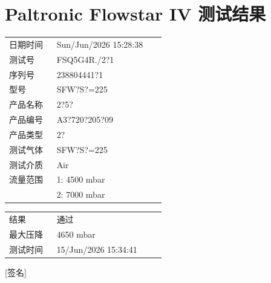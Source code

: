 \documentclass[UTF8,10pt,a4paper,fontset=fandol]{ctexart}
\newcommand{\fieldvalue}[1]{#1}
\newcommand{\handwritten}[1]{#1}
\begin{document}
\newpage

\section*{Paltronic Flowstar IV 测试结果}

\begin{tabular}{@{}p{0.27\linewidth}p{0.62\linewidth}@{}}
日期时间 &
\fieldvalue{Sun/Jun/2026 15:28:38}
\\
测试号 &
\fieldvalue{FSQ5G4R./2?1}
\\
序列号 &
\fieldvalue{238804441?1}
\\
型号 &
\fieldvalue{SFW?S?=225}
\\
产品名称 &
\fieldvalue{2?5?}
\\
产品编号 &
\fieldvalue{A3?720?205?09}
\\
产品类型 &
\fieldvalue{2?}
\\
测试气体 &
\fieldvalue{SFW?S?=225}
\\
测试介质 &
\fieldvalue{Air}
\\
流量范围 &
\fieldvalue{1: 4500 mbar}
\\
&
\fieldvalue{2: 7000 mbar}
\end{tabular}

\medskip
\noindent
\begin{tabular}{@{}p{0.27\linewidth}p{0.62\linewidth}@{}}
结果 &
\fieldvalue{通过}
\\
最大压降 &
\fieldvalue{4650 mbar}
\\
测试时间 &
\fieldvalue{15/Jun/2026 15:34:41}
\end{tabular}

\bigskip

\handwritten{[签名]}
\end{document}
